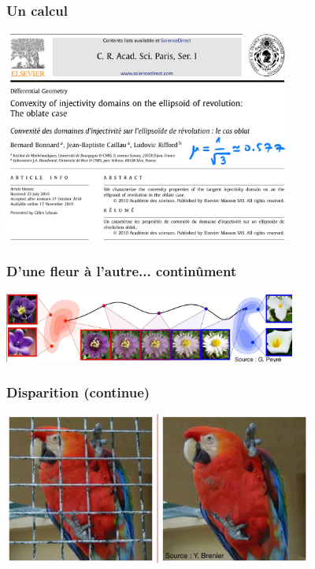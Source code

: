 \documentclass[9pt]{beamer}
\begin{document}
\begin{frame}
\frametitle{\bf Un calcul}
 
\centering \includegraphics[height=7.0cm]{cras2}

\end{frame}

\begin{frame}
\frametitle{\bf D'une fleur \`a l'autre... contin\^ument}
 
\centering \includegraphics[height=2.3cm]{fleur}

\end{frame}

\begin{frame}
\frametitle{\bf Disparition (continue)}
 
\centering \includegraphics[height=5.0cm]{parrot}

\end{frame}
\end{document}
